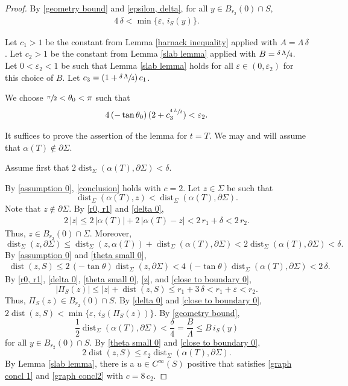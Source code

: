 \documentclass[10pt,a4paper]{amsart}
\begin{document}
	\begin{proof}
By \eqref{geometry bound} and \eqref{epsilon, delta},		 for all $y\in B_{r_2}(0)\cap S$,
		\begin{align} \label{delta 0}
			4\,\delta < \min\{\varepsilon,\,i_S(y)\}.
		\end{align}
		
		Let  $c_1>1$ be the constant from Lemma \ref{harnack inequality} applied with $A=\Lambda\,\delta$. 	Let  $c_2>1$ be the constant from Lemma \ref{slab lemma} applied with $B=\sfrac{\delta\,\Lambda}{4}$. Let $0<\varepsilon_2<1$ be such that Lemma \ref{slab lemma} holds for all $\varepsilon\in(0,\varepsilon_2)$ for this choice of $B$. Let $c_3=(1+\sfrac{\delta\,\Lambda}{4})\,c_1$.
		
		We choose  $\sfrac{\pi}2<\theta_0<\pi$ such that 
				\begin{align}  
			\label{theta small 0}
			4\,(-\tan\theta_0)\,(2+c_3^{\sfrac{4\,L}{\delta}})<\varepsilon_2.		
		\end{align}	
		
		It suffices to prove the assertion of the lemma for $t=T$. We may and will assume that $\alpha(T)\notin \partial \Sigma$.
			
		Assume first that $2\operatorname{dist}_\Sigma(\alpha(T),\partial \Sigma)< \delta$. 
		
		By \eqref{assumption 0}, \eqref{conclusion} holds with $c=2$.  Let $z\in \Sigma$ be such that
		$$
		\operatorname{dist}_\Sigma(\alpha(T),z)<\operatorname{dist}_\Sigma(\alpha(T),\partial \Sigma).
		$$ 
		 Note that $z\notin \partial \Sigma$. By \eqref{r0, r1} and \eqref{delta 0}, \begin{align} \label{z} 2\,|z|\leq 2\,|\alpha(T)|+2\,|\alpha(T)-z|<2\,r_1+\delta<2\, r_2.\end{align}
Thus, $z\in B_{r_2}(0)\cap \Sigma$. Moreover,	
		 $$
		 \operatorname{dist}_\Sigma(z,\partial \Sigma)\leq  \operatorname{dist}_\Sigma(z,\alpha(T))+ \operatorname{dist}_\Sigma(\alpha(T),\partial \Sigma)<2\operatorname{dist}_\Sigma(\alpha(T),\partial \Sigma)<\delta.
		 $$
		By \eqref{assumption 0} and \eqref{theta small 0}, 
		\begin{align} \label{close to boundary 0} 
		\operatorname{dist}(z,S)\leq 2\,(-\tan\theta)\operatorname{dist}_\Sigma(z,\partial \Sigma)<4\,(-\tan\theta)\operatorname{dist}_\Sigma(\alpha(T),\partial \Sigma)<2\,\delta.
		\end{align} 
		By \eqref{r0, r1}, \eqref{delta 0},  \eqref{theta small 0}, \eqref{z}, and \eqref{close to boundary 0}, 
		$$
		|\Pi_S(z)|\leq |z|+\operatorname{dist}(z,S)\leq r_1+3\,\delta<r_1+\varepsilon<r_2.
		$$
		Thus, $\Pi_S(z)\in B_{r_2}(0)\cap S$.
	By \eqref{delta 0}  and \eqref{close to boundary 0},  $2\operatorname{dist}(z,S)< \min\{\varepsilon,\,i_S(\Pi_S(z))\}$. By \eqref{geometry bound},
		$$
		\frac12\operatorname{dist}_\Sigma(\alpha(T),\partial \Sigma)<\frac{\delta}4=\frac{B}{\Lambda}\leq B\,i_S(y)
		$$
		for all $y\in B_{r_2}(0)\cap S$. By \eqref{theta small 0} and \eqref{close to boundary 0},  $$2\operatorname{dist}(z,S)\leq\varepsilon_2\operatorname{dist}_\Sigma(\alpha(T),\partial \Sigma).$$
		By Lemma \ref{slab lemma}, there is a  $u\in C^\infty(S)$ positive that satisfies \eqref{graph concl 1} and \eqref{graph concl2} with $c=8\,c_2$.
		

\end{proof}
\end{document}

